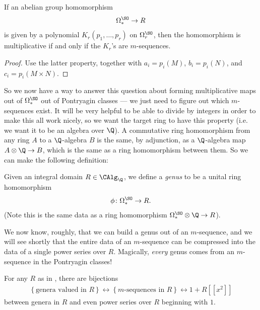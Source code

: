 \documentclass[11pt]{book}
\begin{document}
\begin{proposition} If an abelian group homomorphism
\begin{align*}
    \Omega^\SO_\ast \to R
\end{align*}
is given by a polynomial $K_r(p_1, \ldots, p_r)$ on $\Omega^{\SO}_r$, then the homomorphism is multiplicative if and only if the $K_r$'s are $m$-sequences.
\end{proposition}
\begin{proof} Use the latter property, together with $a_i = p_i(M)$, $b_i = p_i(N)$, and $c_i = p_i(M \times N)$.
\end{proof}


So we now have a way to answer this question about forming multiplicative maps out of $\Omega^\SO_\ast$ out of Pontryagin classes --- we just need to figure out which $m$-sequences exist. It will be very helpful to be able to divide by integers in order to make this all work nicely, so we want the target ring to have this property (i.e. we want it to be an algebra over $\Q$). A commutative ring homomorphism from any ring $A$ to a $\Q$-algebra $B$ is the same, by adjunction, as a $\Q$-algebra map $A \otimes \Q \to B$, which is the same as a ring homomorphism between them. So we can make the following definition:

\begin{definition}\label{def:genus} Given an integral domain $R\in \CAlg_\Q$, we define a \emph{genus} to be a unital ring homomorphism
\begin{align*}
    \phi \colon \Omega^{\SO}_\ast \to R.
\end{align*}
(Note this is the same data as a ring homomorphism $\Omega^\SO_\ast \otimes \Q \to R$).
\end{definition}

We now know, roughly, that we can build a genus out of an $m$-sequence, and we will see shortly that the entire data of an $m$-sequence can be compressed into the data of a single power series over $R$. Magically, \emph{every} genus comes from an $m$-sequence in the Pontryagin classes!


\begin{theorem}\label{thm:genera-char-series-bijection} 
For any $R$ as in , there are bijections
\begin{equation}\label{eqn:genera-even-power-series-bijection}
\begin{aligned}
    \left\{ \text{genera valued in }R \right\} \leftrightarrow \left\{ m\text{-sequences in }R \right\} \leftrightarrow 1+R[[x^2]]
\end{aligned}
\end{equation}
between genera in $R$ and even power series over $R$ beginning with $1$.
\end{theorem}
\end{document}
